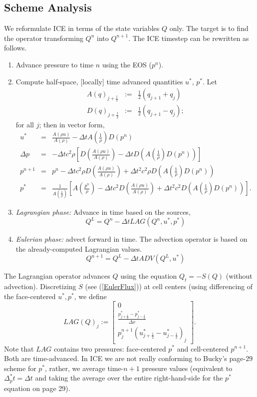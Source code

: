 \documentclass[11pt,oneside]{article}
\def \be {\begin{equation}}
\def \ee {\end{equation}}
\def \D {\Delta}
\def \bn {\begin{enumerate}}
\def \en {\end{enumerate}}
\begin{document}
\subsection{Scheme Analysis}
We reformulate ICE in terms of the state variables $Q$ only. The target is
to find the operator transforming $Q^n$ into $Q^{n+1}$.
The ICE timestep can be rewritten as follows.
\bn
\item Advance pressure to time $n$ using the EOS ($p^n$).
\item Compute half-space, [locally] time advanced quantities $u^*$, $p^*$.
Let
\begin{eqnarray}
A(q)_{j+\frac12} & := & \frac12 \left( q_{j+1} + q_{j} \right) \\
D(q)_{j+\frac12}   & := & \frac12 \left( q_{j+1} - q_{j} \right);
\end{eqnarray}
for all $j$; then in vector form,
\begin{eqnarray}
  u^* & = & \frac{A(\rho u)}{A(\rho)} - \D t A\left(\frac{1}{\rho}\right) D(p^n) \\
  \label{uStar}
  \D p & = & -\D t c^2 \rho \left[ D\left(\frac{A(\rho u)}{A(\rho)}\right) -
  \D t D\left( A \left(\frac{1}{\rho}\right) D(p^n) \right) \right] \\
  \label{Dp}
  p^{n+1} & = & p^n - \D t c^2 \rho D\left( \frac{A(\rho u)}{A(\rho)} \right) +
  \D t^2 c^2 \rho D\left( A \left(\frac{1}{\rho}\right) D(p^n) \right) \\
  \label{PCC}
  p^* & = & \frac{1}{A\left(\frac{1}{\rho}\right)} \left[ A\left(\frac{p^{n}}{\rho} \right)
  - \D t c^2 D\left( \frac{A(\rho u)}{A(\rho)} \right) +
  \D t^2 c^2 D\left( A \left(\frac{1}{\rho}\right) D(p^n) \right) \right].
  \label{pStar}
\end{eqnarray}

\item \emph{Lagrangian phase:} Advance in time based on the sources,
\be
  Q^L = Q^n - \D t LAG(Q^n,u^*,p^*)
  \label{Lagrangian}
\ee
\item \emph{Eulerian phase:} advect forward in time. The advection operator
is based on the already-computed Lagrangian values.
\be
  Q^{n+1} = Q^L - \D t ADV(Q^L,u^*)
  \label{Eulerian}
\ee
\en
The Lagrangian operator advances $Q$ using the equation $Q_t = -S(Q)$
(without advection). Discretizing $S$ (see (\ref{EulerFlux})) at cell
centers (using differencing of the face-centered $u^*,p^*$, we define
\be
  LAG(Q)_j := 
  \left[
  \begin{array}{c}
  0\\
  \frac{p^*_{j+\frac12} - p^*_{j-\frac12}}{\D x} \\
  p^{n+1}_j \left( u^*_{j+\frac12} - u^*_{j-\frac12} \right)_j
  \end{array}
  \right].
\ee
Note that $LAG$ contains two pressures: face-centered $p^*$ and cell-centered
$p^{n+1}$. Both are time-advanced. In ICE we are not really conforming to
Bucky's page-$29$ scheme for $p^*$, rather, we average time-$n+1$ pressure
values (equivalent to $\D^*_p t = \D t$ and taking the average over the entire
right-hand-side for the $p^*$ equation on page 29).
\end{document}
